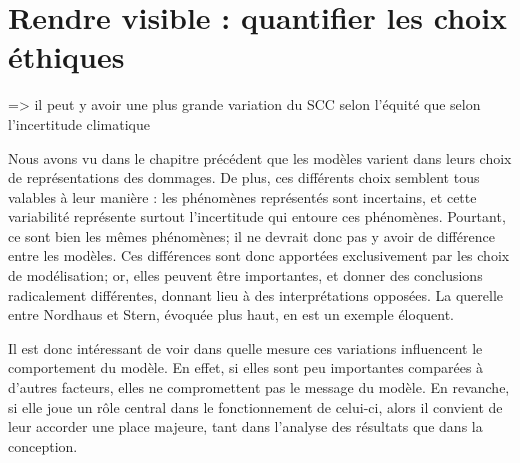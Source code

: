 \chapter{Rendre visible : quantifier les choix éthiques}
\label{chapter:modelisation}
\newrefsegment
{}





\cite{errickson_equity_2021} => il peut y avoir une plus grande variation du SCC selon l'équité que selon l'incertitude climatique

Nous avons vu dans le chapitre précédent que les modèles varient dans leurs choix de représentations des dommages. De plus, ces différents choix semblent tous valables à leur manière : les phénomènes représentés sont incertains, et cette variabilité représente surtout l'incertitude qui entoure ces phénomènes. Pourtant, ce sont bien les mêmes phénomènes; il ne devrait donc pas y avoir de différence entre les modèles. Ces différences sont donc apportées exclusivement par les choix de modélisation; or, elles peuvent être importantes, et donner des conclusions radicalement différentes, donnant lieu à des interprétations opposées. La querelle entre Nordhaus et Stern, évoquée plus haut, en est un exemple éloquent. 

Il est donc intéressant de voir dans quelle mesure ces variations influencent le comportement du modèle. En effet, si elles sont peu importantes comparées à d'autres facteurs, elles ne compromettent pas le message du modèle. En revanche, si elle joue un rôle central dans le fonctionnement de celui-ci, alors il convient de leur accorder une place majeure, tant dans l'analyse des résultats que dans la conception. 

